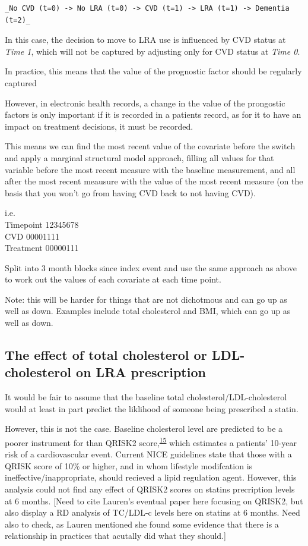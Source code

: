\documentclass[a4paper, nobind]{templates/ociamthesis}
\begin{document}
\begin{verbatim}
_No CVD (t=0) -> No LRA (t=0) -> CVD (t=1) -> LRA (t=1) -> Dementia (t=2)_
\end{verbatim}

In this case, the decision to move to LRA use is influenced by CVD status at \emph{Time 1}, which will not be captured by adjusting only for CVD status at \emph{Time 0}.

In practice, this means that the value of the prognostic factor should be regularly captured

However, in electronic health records, a change in the value of the prongostic factors is only important if it is recorded in a patients record, as for it to have an impact on treatment decisions, it must be recorded.

This means we can find the most recent value of the covariate before the switch and apply a marginal structural model approach, filling all values for that variable before the most recent measure with the baseline measurement, and all after the most recent meausure with the value of the most recent measure (on the basis that you won't go from having CVD back to not having CVD).

i.e.\\
Timepoint 12345678\\
CVD 00001111\\
Treatment 00000111

Split into 3 month blocks since index event and use the same approach as above to work out the values of each covariate at each time point.

Note: this will be harder for things that are not dichotmous and can go up as well as down. Examples include total cholesterol and BMI, which can go up as well as down.

\hypertarget{the-effect-of-total-cholesterol-or-ldl-cholesterol-on-lra-prescription}{%
\subsection{The effect of total cholesterol or LDL-cholesterol on LRA prescription}\label{the-effect-of-total-cholesterol-or-ldl-cholesterol-on-lra-prescription}}

It would be fair to assume that the baseline total cholesterol/LDL-cholesterol would at least in part predict the liklihood of someone being prescribed a statin.

However, this is not the case. Baseline cholesterol level are predicted to be a poorer instrument for than QRISK2 score,\textsuperscript{\protect\hyperlink{ref-hippisley-cox2008}{15}} which estimates a patients' 10-year risk of a cardiovascular event. Current NICE guidelines state that those with a QRISK score of 10\% or higher, and in whom lifestyle modifcation is ineffective/inappropriate, should recieved a lipid regulation agent. However, this analysis could not find any effect of QRISK2 scores on statins precription levels at 6 months. {[}Need to cite Lauren's eventual paper here focusing on QRISK2, but also display a RD analysis of TC/LDL-c levels here on statins at 6 months. Need also to check, as Lauren mentioned she found some evidence that there is a relationship in practices that acutally did what they should.{]}
\end{document}
